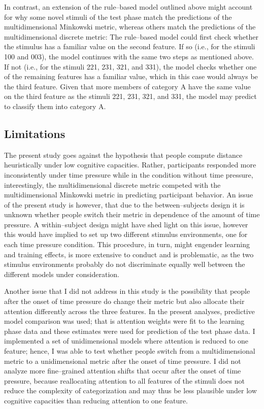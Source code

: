 \documentclass[a4paper,man,natbib]{apa6}
\begin{document}
In contrast, an extension of the rule--based model outlined above might account for why some novel stimuli of the test phase match the predictions of the multidimensional Minkowski metric, whereas others match the predictions of the multidimensional discrete metric: The rule--based model could first check whether the stimulus has a familiar value on the second feature. If so (i.e., for the stimuli 100 and 003), the model continues with the same two steps as mentioned above. If not (i.e., for the stimuli 221, 231, 321, and 331), the model checks whether one of the remaining features has a familiar value, which in this case would always be the third feature. Given that more members of category A have the same value on the third feature as the stimuli 221, 231, 321, and 331, the model may predict to classify them into category A. 

\subsection{Limitations}
The present study goes against the hypothesis that people compute distance heuristically under low cognitive capacities. Rather, participants responded more inconsistently under time pressure while in the condition without time pressure, interestingly, the multidimensional discrete metric competed with the multidimensional Minkowski metric in predicting participant behavior. An issue of the present study is however, that due to the between--subjects design it is unknown whether people switch their metric in dependence of the amount of time pressure. A within--subject design might have shed light on this issue, however this would have implied to set up two different stimulus environments, one for each time pressure condition. This procedure, in turn, might engender learning and training effects, is more extensive to conduct and is problematic, as the two stimulus environments probably do not discriminate equally well between the different models under consideration.

Another issue that I did not address in this study is the possibility that people after the onset of time pressure do change their metric but also allocate their attention differently across the three features. In the present analyses, predictive model comparison was used; that is attention weights were fit to the learning phase data and these estimates were used for prediction of the test phase data. I implemented a set of unidimensional models where attention is reduced to one feature; hence, I was able to test whether people switch from a multidimensional metric to a unidimensional metric after the onset of time pressure. I did not analyze more fine--grained attention shifts that occur after the onset of time pressure, because reallocating attention to all features of the stimuli does not reduce the complexity of categorization and may thus be less plausible under low cognitive capacities than reducing attention to one feature. 
\end{document}
